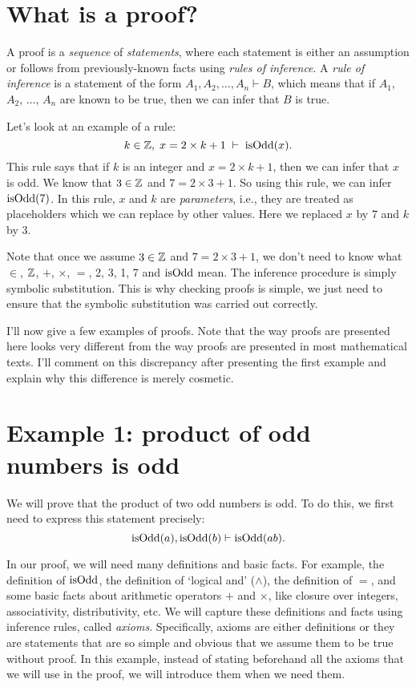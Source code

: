\section{What is a proof?}

A proof is a \emph{sequence} of \emph{statements}, where each statement is
either an assumption or follows from previously-known facts using \emph{rules of inference}.
A \emph{rule of inference} is a statement of the form $A_1, A_2, \ldots, A_n \vdash B$,
which means that if $A_1$, $A_2$, $\ldots$, $A_n$ are known to be true,
then we can infer that $B$ is true.

Let's look at an example of a rule:
\[ k \in \mathbb{Z},\; x = 2 \times k + 1\; \vdash\; \operatorname{isOdd}(x). \]
This rule says that if $k$ is an integer and $x = 2 \times k + 1$,
then we can infer that $x$ is odd.
We know that $3 \in \mathbb{Z}$ and $7 = 2 \times 3 + 1$.
So using this rule, we can infer $\operatorname{isOdd}(7)$.
In this rule, $x$ and $k$ are \emph{parameters}, i.e.,
they are treated as placeholders which we can replace by other values.
Here we replaced $x$ by $7$ and $k$ by $3$.

Note that once we assume $3 \in \mathbb{Z}$ and $7 = 2 \times 3 + 1$,
we don't need to know what $\in$, $\mathbb{Z}$, $+$, $\times$, $=$, 2, 3, 1, 7 and $\operatorname{isOdd}$ mean.
The inference procedure is simply symbolic substitution.
This is why checking proofs is simple, we just need to ensure
that the symbolic substitution was carried out correctly.

I'll now give a few examples of proofs.
Note that the way proofs are presented here looks very different from
the way proofs are presented in most mathematical texts.
I'll comment on this discrepancy after presenting the first example
and explain why this difference is merely cosmetic.

\section{Example 1: product of odd numbers is odd}

We will prove that the product of two odd numbers is odd.
To do this, we first need to express this statement precisely:
\[ \operatorname{isOdd}(a), \operatorname{isOdd}(b) \vdash \operatorname{isOdd}(ab). \]

In our proof, we will need many definitions and basic facts.
For example, the definition of $\operatorname{isOdd}$, the definition of `logical and' ($\land$),
the definition of $=$, and some basic facts about arithmetic operators $+$ and $\times$,
like closure over integers, associativity, distributivity, etc.
We will capture these definitions and facts using inference rules, called \emph{axioms}.
Specifically, axioms are either definitions or they are statements that are
so simple and obvious that we assume them to be true without proof.
In this example, instead of stating beforehand all the axioms that we will use in the proof,
we will introduce them when we need them.

